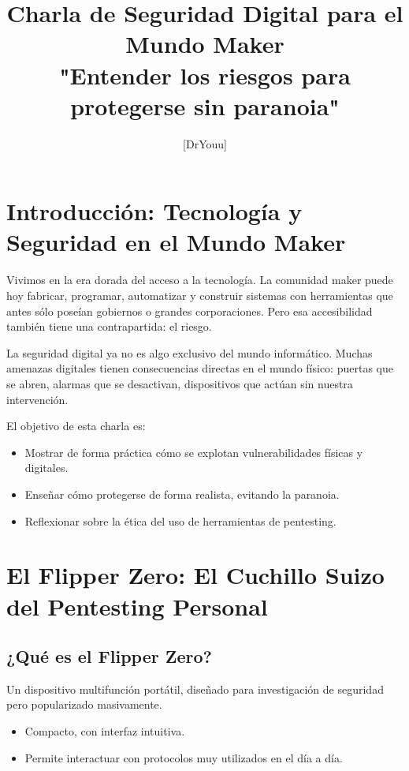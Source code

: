 \documentclass[a4paper,12pt]{article}
\title{\textbf{Charla de Seguridad Digital para el Mundo Maker \\ \large "Entender los riesgos para protegerse sin paranoia"}}
\author{[DrYouu]}
\date{}
\begin{document}
\maketitle

\tableofcontents
\newpage

\section{Introducción: Tecnología y Seguridad en el Mundo Maker}

Vivimos en la era dorada del acceso a la tecnología. La comunidad maker puede hoy fabricar, programar, automatizar y construir sistemas con herramientas que antes sólo poseían gobiernos o grandes corporaciones. Pero esa accesibilidad también tiene una contrapartida: el riesgo.

La seguridad digital ya no es algo exclusivo del mundo informático. Muchas amenazas digitales tienen consecuencias directas en el mundo físico: puertas que se abren, alarmas que se desactivan, dispositivos que actúan sin nuestra intervención.

El objetivo de esta charla es:

\begin{itemize}
    \item Mostrar de forma práctica cómo se explotan vulnerabilidades físicas y digitales.
    \item Enseñar cómo protegerse de forma realista, evitando la paranoia.
    \item Reflexionar sobre la ética del uso de herramientas de pentesting.
\end{itemize}

\section{El Flipper Zero: El Cuchillo Suizo del Pentesting Personal}

\subsection{¿Qué es el Flipper Zero?}

Un dispositivo multifunción portátil, diseñado para investigación de seguridad pero popularizado masivamente.

\begin{itemize}
    \item Compacto, con interfaz intuitiva.
    \item Permite interactuar con protocolos muy utilizados en el día a día.
\end{itemize}
\end{document}
